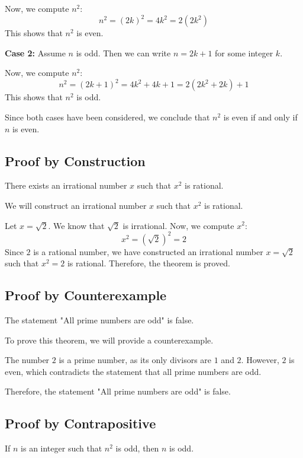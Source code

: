 	Now, we compute \( n^2 \):
	\[
		n^2 = (2k)^2 = 4k^2 = 2(2k^2)
	\]
	This shows that \( n^2 \) is even.

	\textbf{Case 2:} Assume \( n \) is odd. Then we can write \( n = 2k + 1 \) for some integer \( k \).

	Now, we compute \( n^2 \):
	\[
		n^2 = (2k + 1)^2 = 4k^2 + 4k + 1 = 2(2k^2 + 2k) + 1
	\]
	This shows that \( n^2 \) is odd.

	Since both cases have been considered, we conclude that \( n^2 \) is even if and only if \( n \) is even.

\QED

\subsection{Proof by Construction}

There exists an irrational number \( x \) such that \( x^2 \) is rational.


	We will construct an irrational number \( x \) such that \( x^2 \) is rational.

	Let \( x = \sqrt{2} \). We know that \( \sqrt{2} \) is irrational. Now, we compute \( x^2 \):
	\[
		x^2 = (\sqrt{2})^2 = 2
	\]
	Since \( 2 \) is a rational number, we have constructed an irrational number \( x = \sqrt{2} \) such that \( x^2 = 2 \) is rational.
	Therefore, the theorem is proved.

\QED

\subsection{Proof by Counterexample}

The statement "All prime numbers are odd" is false.


	To prove this theorem, we will provide a counterexample.

	The number \( 2 \) is a prime number, as its only divisors are \( 1 \) and \( 2 \). However, \( 2 \) is even, which contradicts the statement that all prime numbers are odd.

	Therefore, the statement "All prime numbers are odd" is false.

\QED

\subsection{Proof by Contrapositive}

If \( n \) is an integer such that \( n^2 \) is odd, then \( n \) is odd.


